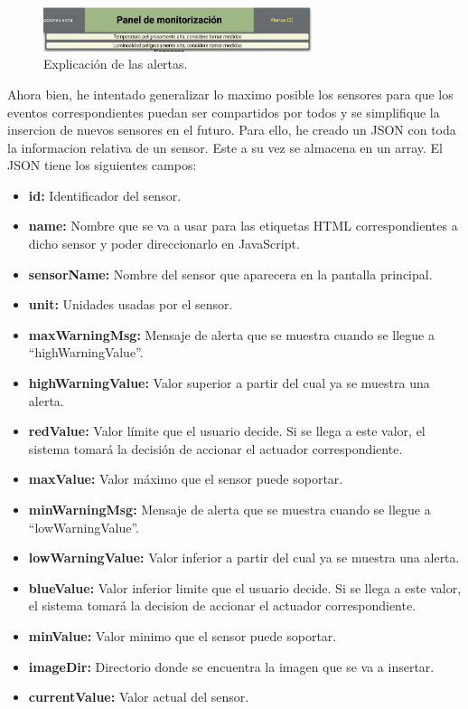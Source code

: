 \documentclass{article}
\begin{document}
\begin{figure}[H]
    \centering
    \includegraphics[width=0.7\textwidth]{images/alertamsg.png}
    \caption{Explicación de las alertas.}
\end{figure}

Ahora bien, he intentado generalizar lo maximo posible los sensores para que los eventos correspondientes puedan ser compartidos por todos y se simplifique la insercion de nuevos sensores en el futuro. Para ello, he creado un JSON con toda la informacion relativa de un sensor. Este a su vez se almacena en un array. El JSON tiene los siguientes campos:

\begin{itemize}
    \item \textbf{id: }Identificador del sensor.
    \item \textbf{name: }Nombre que se va a usar para las etiquetas HTML correspondientes a dicho sensor y poder direccionarlo en JavaScript.
    \item \textbf{sensorName: }Nombre del sensor que aparecera en la pantalla principal.
    \item \textbf{unit: }Unidades usadas por el sensor.
    \item \textbf{maxWarningMsg: }Mensaje de alerta que se muestra cuando se llegue a ``highWarningValue''.
    \item \textbf{highWarningValue: }Valor superior a partir del cual ya se muestra una alerta.
    \item \textbf{redValue: }Valor límite que el usuario decide. Si se llega a este valor, el sistema tomará la decisión de accionar el actuador correspondiente.
    \item \textbf{maxValue: }Valor máximo que el sensor puede soportar.
    \item \textbf{minWarningMsg: }Mensaje de alerta que se muestra cuando se llegue a ``lowWarningValue''.
    \item \textbf{lowWarningValue: }Valor inferior a partir del cual ya se muestra una alerta.
    \item \textbf{blueValue: }Valor inferior limite que el usuario decide. Si se llega a este valor, el sistema tomará la decision de accionar el actuador correspondiente.
    \item \textbf{minValue: }Valor minimo que el sensor puede soportar.
    \item \textbf{imageDir: }Directorio donde se encuentra la imagen que se va a insertar.
    \item \textbf{currentValue: }Valor actual del sensor.
\end{itemize}
\end{document}
